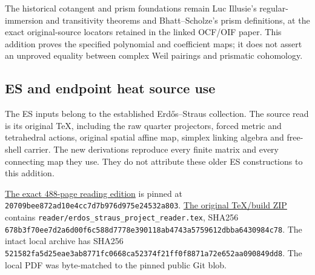 \documentclass[
  10pt,
  a4paper,
]{article}
\begin{document}
The historical cotangent and prism foundations remain Luc Illusie's
regular-immersion and transitivity theorems and Bhatt--Scholze's prism
definitions, at the exact original-source locators retained in the
linked OCF/OIF paper. This addition proves the specified polynomial and
coefficient maps; it does not assert an unproved equality between
complex Weil pairings and prismatic cohomology.

\subsection{ES and endpoint heat source
use}\label{es-and-endpoint-heat-source-use}

The ES inputs belong to the established Erdős--Straus collection. The
source read is its original TeX, including the raw quarter projectors,
forced metric and tetrahedral actions, original spatial affine map,
simplex linking algebra and free-shell carrier. The new derivations
reproduce every finite matrix and every connecting map they use. They do
not attribute these older ES constructions to this addition.

\href{https://github.com/KokunoYumeto/erdos-straus-foundation/blob/20709bee872ad10e4cc7d7b976d975e24532a803/00_ERDOS_STRAUSS_Project_Reader.pdf}{The
exact 488-page reading edition} is pinned at
\texttt{20709bee\allowbreak{}872ad10e\allowbreak{}4cc7d7b9\allowbreak{}76d975e2\allowbreak{}4532a803}.
\href{https://github.com/KokunoYumeto/erdos-straus-foundation/blob/20709bee872ad10e4cc7d7b976d975e24532a803/01_ERDOS_STRAUSS_Reader_Source_and_Build.zip}{The
original TeX/build ZIP} contains
\texttt{reader/\allowbreak{}erdos\_\allowbreak{}straus\_\allowbreak{}project\_\allowbreak{}reader.\allowbreak{}tex}, SHA256
\texttt{678b3f70\allowbreak{}ee7d2a6d\allowbreak{}00f6c588\allowbreak{}d7778e39\allowbreak{}0118ab47\allowbreak{}43a57596\allowbreak{}12dbba64\allowbreak{}30984c78}.
The intact local archive has SHA256
\texttt{521582fa\allowbreak{}5d25eae3\allowbreak{}ab8771fc\allowbreak{}0668ca52\allowbreak{}374f21ff\allowbreak{}0f8871a7\allowbreak{}2e652aa0\allowbreak{}90849dd8}.
The local PDF was byte-matched to the pinned public Git blob.
\end{document}
